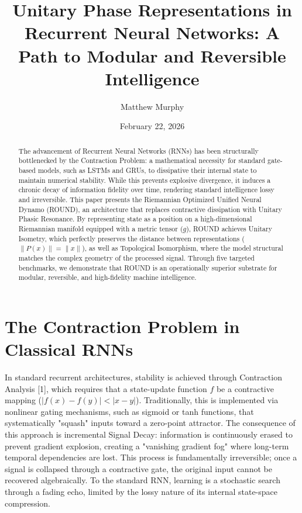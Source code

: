 \documentclass[11pt]{article}
\title{Unitary Phase Representations in Recurrent Neural Networks: A Path to Modular and Reversible Intelligence}
\author{Matthew Murphy}
\date{February 22, 2026}
\begin{document}
\maketitle

\begin{abstract}
The advancement of Recurrent Neural Networks (RNNs) has been structurally bottlenecked by the Contraction Problem: a mathematical necessity for standard gate-based models, such as LSTMs and GRUs, to dissipative their internal state to maintain numerical stability. While this prevents explosive divergence, it induces a chronic decay of information fidelity over time, rendering standard intelligence lossy and irreversible. This paper presents the Riemannian Optimized Unified Neural Dynamo (ROUND), an architecture that replaces contractive dissipation with Unitary Phasic Resonance. By representing state as a position on a high-dimensional Riemannian manifold equipped with a metric tensor ($g$), ROUND achieves Unitary Isometry, which perfectly preserves the distance between representations ($\|P(x)\| = \|x\|$), as well as Topological Isomorphism, where the model structural matches the complex geometry of the processed signal. Through five targeted benchmarks, we demonstrate that ROUND is an operationally superior substrate for modular, reversible, and high-fidelity machine intelligence.
\end{abstract}

\newpage

\section{The Contraction Problem in Classical RNNs}

In standard recurrent architectures, stability is achieved through Contraction Analysis [1], which requires that a state-update function $f$ be a contractive mapping ($|f(x) - f(y)| < |x - y|$). Traditionally, this is implemented via nonlinear gating mechanisms, such as sigmoid or tanh functions, that systematically "squash" inputs toward a zero-point attractor. The consequence of this approach is incremental Signal Decay: information is continuously erased to prevent gradient explosion, creating a "vanishing gradient fog" where long-term temporal dependencies are lost. This process is fundamentally irreversible; once a signal is collapsed through a contractive gate, the original input cannot be recovered algebraically. To the standard RNN, learning is a stochastic search through a fading echo, limited by the lossy nature of its internal state-space compression.
\end{document}
